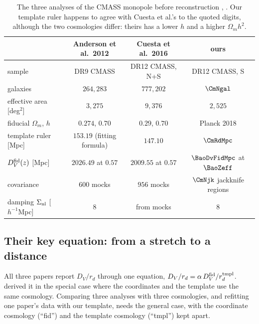\begin{table}[htbp]
\centering
\small
\begin{tabular}{@{}lccc@{}}
\toprule
 & Anderson et al.\ 2012 & Cuesta et al.\ 2016 & ours\\\midrule
sample & DR9 CMASS & DR12 CMASS, N+S & DR12 CMASS, S\\
galaxies & $264{,}283$ & $777{,}202$ & $\CmNgal$\\
effective area [deg$^2$] & $3{,}275$ & $9{,}376$ & $2{,}525$\\
fiducial $\Omega_m$, $h$ & $0.274$, $0.70$ & $0.29$, $0.70$ & Planck 2018\\
template ruler [Mpc] & $153.19$ (fitting formula) & $147.10$ & $\CmRdMpc$\\
$D_V^{\rm fid}(z)$ [Mpc] & $2026.49$ at $0.57$ & $2009.55$ at $0.57$ & $\BaoDvFidMpc$ at $\BaoZeff$\\
covariance & $600$ mocks & $956$ mocks & $\CmNjk$ jackknife regions\\
damping $\Sigma_{\rm nl}$ [$h^{-1}$Mpc] & $8$ & from mocks & $8$\\
\bottomrule
\end{tabular}
\caption{The three analyses of the CMASS monopole before reconstruction
, . Our
template ruler happens to agree with Cuesta et al.'s to the quoted digits, although
the two cosmologies differ: theirs has a lower $h$ and a higher $\Omega_m h^2$.}
\label{13c:tab:setup}
\end{table}

\subsection{Their key equation: from a stretch to a distance}
\label{13c:sec:repro-equation}

All three papers report $D_V/r_d$ through one equation, $D_V/r_d=\alpha\,D_V^{\rm fid}/r_d^{\rm tmpl}$.
 derived it in the special case where the coordinates and the
template use the same cosmology. Comparing three analyses with three cosmologies, and
refitting one paper's data with our template, needs the general case, with the
coordinate cosmology (``fid'') and the template cosmology (``tmpl'') kept apart.


